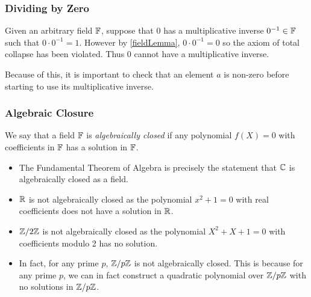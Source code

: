 \documentclass[../main.tex]{subfiles}
\begin{document}
\subsubsection{Dividing by Zero}
Given an arbitrary field $\mathbb{F}$, suppose that $0$ has a multiplicative inverse $0^{-1} \in \mathbb{F}$ such that $0 \cdot 0^{-1} = 1$.
However by \cref{fieldLemma}, $0 \cdot 0^{-1} = 0$ so the axiom of total collapse has been violated.
Thus $0$ cannot have a multiplicative inverse.

Because of this, it is important to check that an element $a$ is non-zero before starting to use its multiplicative inverse.
\subsubsection{Algebraic Closure}
\begin{definition}
  We say that a field $\mathbb{F}$ is \textit{algebraically closed} if any polynomial $f(X) = 0$ with coefficients in $\mathbb{F}$ has a solution in $\mathbb{F}$.
\end{definition}
\begin{example}
  \begin{itemize}
    \item The Fundamental Theorem of Algebra is precisely the statement that $\mathbb{C}$ is algebraically closed as a field.
    \item $\mathbb{R}$ is not algebraically closed as the polynomial $x^2 + 1 = 0$ with real coefficients does not have a solution in $\mathbb{R}$.
    \item $\mathbb{Z} / 2\mathbb{Z}$ is not algebraically closed as the polynomial $X^2 + X + 1 = 0$ with coefficients modulo 2 has no solution.
    \item In fact, for any prime $p$, $\mathbb{Z} / p \mathbb{Z}$ is not algebraically closed.
      This is because for any prime $p$, we can in fact construct a quadratic polynomial over $\mathbb{Z} / p \mathbb{Z}$ with no solutions in $\mathbb{Z} / p \mathbb{Z}$.
  \end{itemize}
\end{example}
\end{document}
